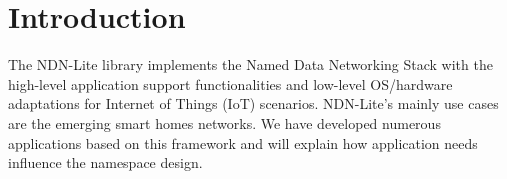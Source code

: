 \section{Introduction}
\label{sec:introduction}

The NDN-Lite library implements the Named Data Networking Stack with the high-level application support functionalities and low-level OS/hardware adaptations for Internet of Things (IoT) scenarios.
NDN-Lite's mainly use cases are the emerging smart homes networks.
We have developed numerous applications based on this framework and will explain how application needs influence the namespace design.